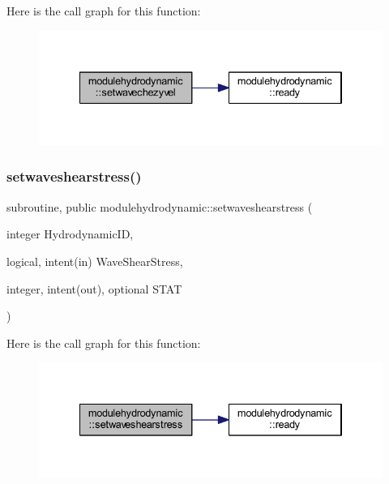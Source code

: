 Here is the call graph for this function\+:\nopagebreak
\begin{figure}[H]
\begin{center}
\leavevmode
\includegraphics[width=334pt]{namespacemodulehydrodynamic_ad7a33c322002783aeb2b7b50ed690a4b_cgraph}
\end{center}
\end{figure}
\mbox{\label{namespacemodulehydrodynamic_a820fb4f4565d7dc61e2cfa6517a1390f}} 
\subsubsection{\texorpdfstring{setwaveshearstress()}{setwaveshearstress()}}
{\footnotesize\ttfamily subroutine, public modulehydrodynamic\+::setwaveshearstress (\begin{DoxyParamCaption}\item[{integer}]{Hydrodynamic\+ID,  }\item[{logical, intent(in)}]{Wave\+Shear\+Stress,  }\item[{integer, intent(out), optional}]{S\+T\+AT }\end{DoxyParamCaption})}

Here is the call graph for this function\+:\nopagebreak
\begin{figure}[H]
\begin{center}
\leavevmode
\includegraphics[width=334pt]{namespacemodulehydrodynamic_a820fb4f4565d7dc61e2cfa6517a1390f_cgraph}
\end{center}
\end{figure}
\mbox{\label{namespacemodulehydrodynamic_a9286159a46a146fe7713e10cda0bf636}} 
